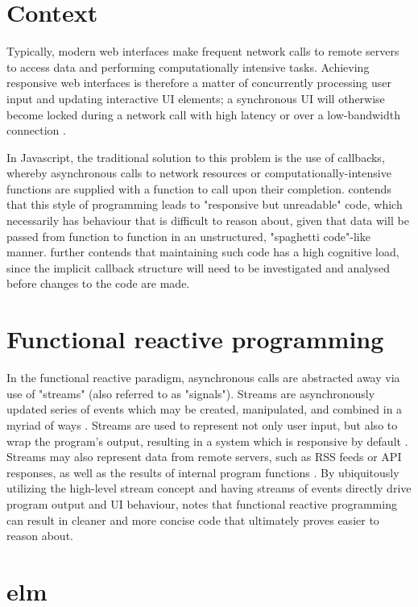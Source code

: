 \documentclass[12pt]{article}
\begin{document}
\section{Context}
Typically, modern web interfaces make frequent network calls to remote servers to access data and performing computationally intensive tasks. Achieving responsive web interfaces is therefore a matter of concurrently processing user input and updating interactive UI elements; a synchronous UI will otherwise become locked during a network call with high latency or over a low-bandwidth connection \citep{czaplicki_2012}.

In Javascript, the traditional solution to this problem is the use of callbacks, whereby asynchronous calls to network resources or computationally-intensive functions are supplied with a function to call upon their completion. \cite{czaplicki_2012} contends that this style of programming leads to "responsive but unreadable" code, which necessarily has behaviour that is difficult to reason about, given that data will be passed from function to function in an unstructured, "spaghetti code"-like manner. \cite{czaplicki_2012} further contends that maintaining such code has a high cognitive load, since the implicit callback structure will need to be investigated and analysed before changes to the code are made.


\section{Functional reactive programming}
In the functional reactive paradigm, asynchronous calls are abstracted away via use of "streams" (also referred to as "signals"). Streams are asynchronously updated series of events which may be created, manipulated, and combined in a myriad of ways \citep{staltz_2014}. Streams are used to represent not only user input, but also to wrap the program's output, resulting in a system which is responsive by default \citep{czaplicki_2012}. Streams may also represent data from remote servers, such as RSS feeds or API responses, as well as the results of internal program functions \citep{staltz_2014}. By ubiquitously utilizing the high-level stream concept and having streams of events directly drive program output and UI behaviour, \cite{staltz_2014} notes that functional reactive programming can result in cleaner and more concise code that ultimately proves easier to reason about.



\section{elm}
\end{document}
